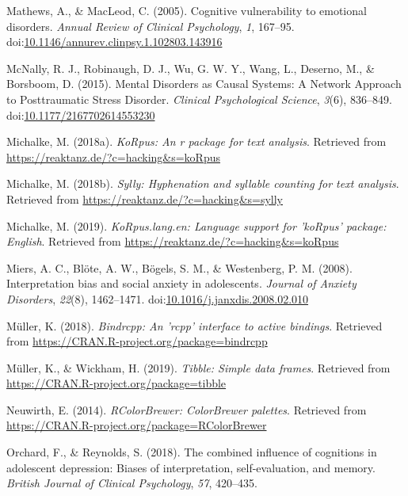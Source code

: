 \documentclass[man,floatsintext]{apa6}
\begin{document}
\leavevmode\hypertarget{ref-Mathews2005}{}%
Mathews, A., \& MacLeod, C. (2005). Cognitive vulnerability to emotional disorders. \emph{Annual Review of Clinical Psychology}, \emph{1}, 167--95. doi:\href{https://doi.org/10.1146/annurev.clinpsy.1.102803.143916}{10.1146/annurev.clinpsy.1.102803.143916}

\leavevmode\hypertarget{ref-McNally2011}{}%
McNally, R. J., Robinaugh, D. J., Wu, G. W. Y., Wang, L., Deserno, M., \& Borsboom, D. (2015). Mental Disorders as Causal Systems: A Network Approach to Posttraumatic Stress Disorder. \emph{Clinical Psychological Science}, \emph{3}(6), 836--849. doi:\href{https://doi.org/10.1177/2167702614553230}{10.1177/2167702614553230}

\leavevmode\hypertarget{ref-R-koRpus}{}%
Michalke, M. (2018a). \emph{KoRpus: An r package for text analysis}. Retrieved from \url{https://reaktanz.de/?c=hacking\&s=koRpus}

\leavevmode\hypertarget{ref-R-sylly}{}%
Michalke, M. (2018b). \emph{Sylly: Hyphenation and syllable counting for text analysis}. Retrieved from \url{https://reaktanz.de/?c=hacking\&s=sylly}

\leavevmode\hypertarget{ref-R-koRpus.lang.en}{}%
Michalke, M. (2019). \emph{KoRpus.lang.en: Language support for 'koRpus' package: English}. Retrieved from \url{https://reaktanz.de/?c=hacking\&s=koRpus}

\leavevmode\hypertarget{ref-miers_interpretation_2008}{}%
Miers, A. C., Blöte, A. W., Bögels, S. M., \& Westenberg, P. M. (2008). Interpretation bias and social anxiety in adolescents. \emph{Journal of Anxiety Disorders}, \emph{22}(8), 1462--1471. doi:\href{https://doi.org/10.1016/j.janxdis.2008.02.010}{10.1016/j.janxdis.2008.02.010}

\leavevmode\hypertarget{ref-R-bindrcpp}{}%
Müller, K. (2018). \emph{Bindrcpp: An 'rcpp' interface to active bindings}. Retrieved from \url{https://CRAN.R-project.org/package=bindrcpp}

\leavevmode\hypertarget{ref-R-tibble}{}%
Müller, K., \& Wickham, H. (2019). \emph{Tibble: Simple data frames}. Retrieved from \url{https://CRAN.R-project.org/package=tibble}

\leavevmode\hypertarget{ref-R-RColorBrewer}{}%
Neuwirth, E. (2014). \emph{RColorBrewer: ColorBrewer palettes}. Retrieved from \url{https://CRAN.R-project.org/package=RColorBrewer}

\leavevmode\hypertarget{ref-orchard_combined_2018}{}%
Orchard, F., \& Reynolds, S. (2018). The combined influence of cognitions in adolescent depression: Biases of interpretation, self-evaluation, and memory. \emph{British Journal of Clinical Psychology}, \emph{57}, 420--435.
\end{document}
